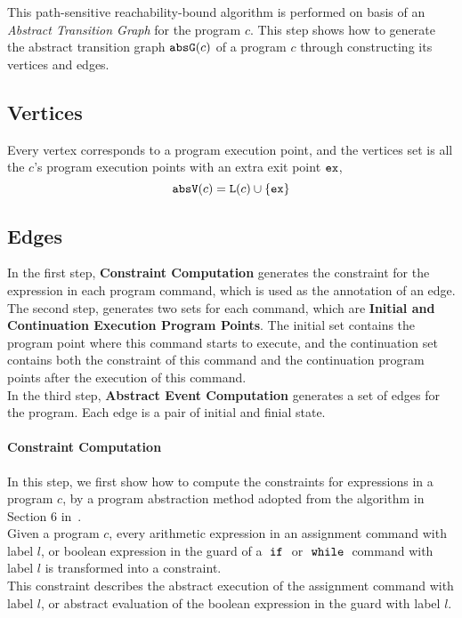 This path-sensitive reachability-bound algorithm
is performed on basis of an \emph{Abstract Transition Graph} for the program $c$.
This step shows how to generate the abstract transition graph $\mathtt{abs}{\mathtt{G}}(c)$ of a
program $c$ through constructing its vertices and edges.

\subsection{Vertices}
\label{sec:abs_prog-vertex}
Every 
vertex corresponds to a program execution point, 
and the vertices set is all the $c$'s program execution points with an extra exit point ${\mathtt{ex}}$, 
\[ 
  \mathtt{abs}{\mathtt{V}}(c) = \mathtt{L}(c)\cup\{{\mathtt{ex}}\}
  \]

\subsection{Edges}
\label{sec:abs_prog-edge}
  In the first step, \textbf{Constraint Computation} generates the constraint
  for the expression in each program command,
  which is used as the annotation of an edge.
  \\
The second step, generates two sets for each command, which are \textbf{Initial and Continuation Execution Program Points}. 
  The initial set contains the
  program point where this command {starts} to execute, 
  and the continuation set contains both the constraint of this command
  and the continuation program points after the execution of this command.
  \\ 
  In the third step, \textbf{Abstract Event Computation} generates a set of edges for the program.
  Each edge is a pair of initial and finial state.
%
\paragraph{Constraint Computation}
In this step, we first show how to compute the constraints for expressions in a program $c$,
by a program abstraction method adopted from the
algorithm in Section 6 in~\cite{sinn2017complexity}.
\\
Given a program $c$,
every arithmetic expression in an assignment command with label $l$,
or boolean expression in the guard of a $\;\mathtt{if}\;$ or $\;\mathtt{while}\;$ command with label $l$
is transformed into a constraint.
\\
This constraint describes the abstract execution of the assignment command with label $l$,
or abstract evaluation of the boolean expression in the guard with label $l$.

